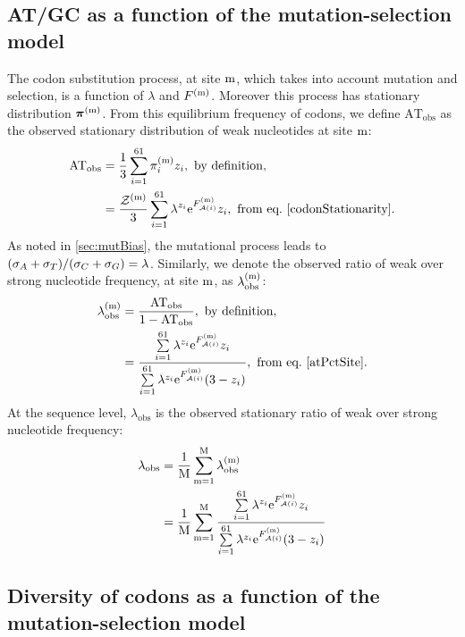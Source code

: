 \subsection{AT/GC as a function of the mutation-selection model}
The \gls{codon} \gls{substitution} process, at site $\text{m}$, which takes into account mutation and selection, is a function of $\lambda$ and $F^{(\text{m})}$.
Moreover this process has stationary distribution $\bm{\pi}^{(\text{m})}$.
From this equilibrium frequency of \glspl{codon}, we define $\mathrm{AT_{obs}}$ as the observed stationary distribution of weak nucleotides at site $\text{m}$:
\begin{align}
    \mathrm{AT_{obs}}
    & = \frac{1}{3} \sum\limits_{\ci=1}^{61}  \subequi_{\ci}\siteexp \nbrWeak_{\ci} , \ \textrm{by definition},\\
    & = \frac{\mathcal{Z}\siteexp}{3} \sum\limits_{\ci=1}^{61} \lambda^{\nbrWeak_{\ci}} \e^{\Fiti\siteexp} \nbrWeak_{\ci} , \ \textrm{from eq.} \ \ref{codonStationarity}.
    \label{atPctSite}
\end{align}
As noted in \ref{sec:mutBias}, the mutational process leads to $(\sigma_A+\sigma_T)/(\sigma_C+\sigma_G) = \lambda$.
Similarly, we denote the observed ratio of weak over strong nucleotide frequency, at site $\text{m}$, as $\lambda_{\mathrm{obs}}^{(\text{m})} $:
\begin{align}
    \lambda_{\mathrm{obs}}\siteexp 
    & = \dfrac{\mathrm{AT_{obs}}}{1 - \mathrm{AT_{obs}} }, \ \textrm{by definition},\\
    & = \dfrac{ \sum\limits_{\ci=1}^{61} \lambda^{\nbrWeak_{\ci}} \e^{\Fiti\siteexp} \nbrWeak_{\ci}}{\sum\limits_{\ci=1}^{61} \lambda^{\nbrWeak_{\ci}} \e^{\Fiti\siteexp} (3 - \nbrWeak_{\ci} )}, \ \textrm{from eq.} \ \ref{atPctSite}.
\end{align}
At the sequence level, $\lambda_{\mathrm{obs}} $ is the observed stationary ratio of weak over strong nucleotide frequency:
\begin{align}
    \lambda_{\mathrm{obs}}
    & = \dfrac{1}{\text{M}} \sum\limits_{\text{m}=1}^{\text{M}} \lambda_{\mathrm{obs}}^{(\text{m})} \\
    & = \dfrac{1}{\text{M}} \sum\limits_{\text{m}=1}^{\text{M}} \dfrac{ \sum\limits_{{i}=1}^{61} \lambda^{{z}_{{i}}} \mathrm{e}^{F_{\mathcal{A}({i})}^{(\text{m})}} {z}_{{i}}}{\sum\limits_{{i}=1}^{61} \lambda^{{z}_{{i}}} \mathrm{e}^{F_{\mathcal{A}({i})}^{(\text{m})}} (3 - {z}_{{i}} )}
\end{align}

\subsection{Diversity of {codons} as a function of the mutation-selection model}

